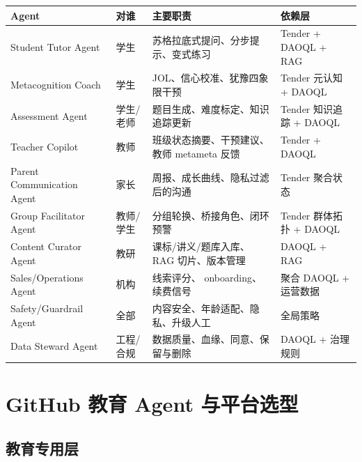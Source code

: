 \documentclass[UTF8,a4paper,11pt]{ctexart}
\begin{document}
\begin{center}
\begin{longtable}{@{}p{2.8cm}p{3.6cm}p{4.6cm}p{3.0cm}@{}}
\toprule
\textbf{Agent} & \textbf{对谁} & \textbf{主要职责} & \textbf{依赖层} \\
\midrule
Student Tutor Agent & 学生 & 苏格拉底式提问、分步提示、变式练习 & Tender + DAOQL + RAG \\
Metacognition Coach & 学生 & JOL、信心校准、犹豫四象限干预 & Tender 元认知 + DAOQL \\
Assessment Agent & 学生/老师 & 题目生成、难度标定、知识追踪更新 & Tender 知识追踪 + DAOQL \\
Teacher Copilot & 教师 & 班级状态摘要、干预建议、教师 metameta 反馈 & Tender + DAOQL \\
Parent Communication Agent & 家长 & 周报、成长曲线、隐私过滤后的沟通 & Tender 聚合状态 \\
Group Facilitator Agent & 教师/学生 & 分组轮换、桥接角色、闭环预警 & Tender 群体拓扑 + DAOQL \\
Content Curator Agent & 教研 & 课标/讲义/题库入库、RAG 切片、版本管理 & DAOQL + RAG \\
Sales/Operations Agent & 机构 & 线索评分、 onboarding、续费信号 & 聚合 DAOQL + 运营数据 \\
Safety/Guardrail Agent & 全部 & 内容安全、年龄适配、隐私、升级人工 & 全局策略 \\
Data Steward Agent & 工程/合规 & 数据质量、血缘、同意、保留与删除 & DAOQL + 治理规则 \\
\bottomrule
\end{longtable}
\end{center}

\section{GitHub 教育 Agent 与平台选型}

\subsection{教育专用层}
\end{document}
